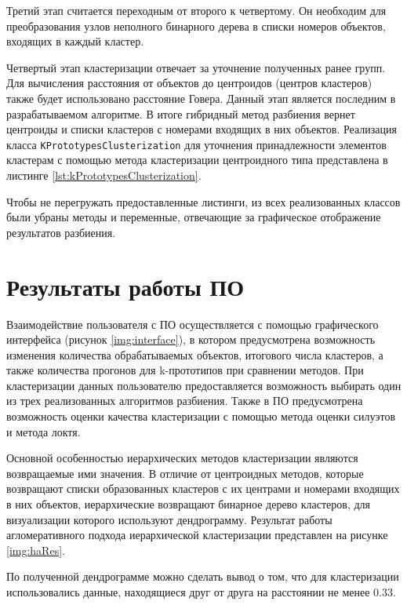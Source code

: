 Третий этап считается переходным от второго к четвертому. Он необходим для преобразования узлов неполного бинарного дерева в списки номеров объектов, входящих в каждый кластер.

Четвертый этап кластеризации отвечает за уточнение полученных ранее групп. Для вычисления расстояния от объектов до центроидов (центров кластеров) также будет использовано расстояние Говера. Данный этап является последним в разрабатываемом алгоритме. В итоге гибридный метод разбиения вернет центроиды и списки кластеров с номерами входящих в них объектов.
Реализация класса \texttt{KPrototypesClusterization} для уточнения принадлежности элементов кластерам с помощью метода кластеризации центроидного типа представлена в листинге \ref{lst:kPrototypesClusterization}.

Чтобы не перегружать предоставленные листинги, из всех реализованных классов были убраны методы и переменные, отвечающие за графическое отображение результатов разбиения.
\clearpage

\section{Результаты работы ПО}

Взаимодействие пользователя с ПО осуществляется с помощью графического интерфейса (рисунок \ref{img:interface}), в котором предусмотрена возможность изменения количества обрабатываемых объектов, итогового числа кластеров, а также количества прогонов для k-прототипов при сравнении методов. При кластеризации данных пользователю предоставляется возможность выбирать один из трех реализованных алгоритмов разбиения. Также в ПО предусмотрена возможность оценки качества кластеризации с помощью метода оценки силуэтов и метода локтя.

\clearpage
Основной особенностью иерархических методов кластеризации являются возвращаемые ими значения. В отличие от центроидных методов, которые возвращают списки образованных кластеров с их центрами и номерами входящих в них объектов, иерархические возвращают бинарное дерево кластеров, для визуализации которого используют дендрограмму. Результат работы агломеративного подхода иерархической кластеризации представлен на рисунке \ref{img:haRes}.

По полученной дендрограмме можно сделать вывод о том, что для кластеризации использовались данные, находящиеся друг от друга на расстоянии не менее 0.33.

